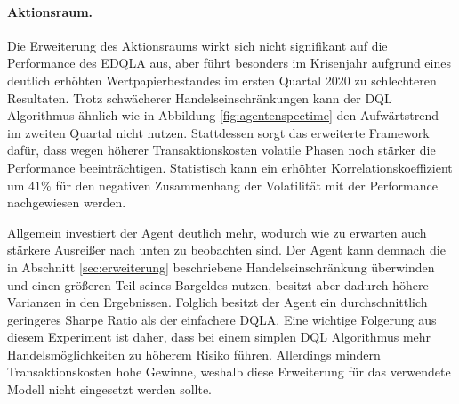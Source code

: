 \paragraph{Aktionsraum.}

Die Erweiterung des Aktionsraums wirkt sich nicht signifikant auf die Performance des \acs{EDQLA} aus, aber führt besonders im Krisenjahr aufgrund eines deutlich erhöhten Wertpapierbestandes im ersten Quartal 2020 zu schlechteren Resultaten. 
Trotz schwächerer Handelseinschränkungen kann der \acs{DQL} Algorithmus ähnlich wie in Abbildung \ref{fig:agentenspectime} den Aufwärtstrend im zweiten Quartal nicht nutzen.
Stattdessen sorgt das erweiterte Framework dafür, dass wegen höherer Transaktionskosten volatile Phasen noch stärker die Performance beeinträchtigen.
Statistisch kann ein erhöhter Korrelationskoeffizient um $41\%$ für den negativen Zusammenhang der Volatilität mit der Performance nachgewiesen werden.

Allgemein investiert der Agent deutlich mehr, wodurch wie zu erwarten auch stärkere Ausreißer nach unten zu beobachten sind.
Der Agent kann demnach die in Abschnitt \ref{sec:erweiterung} beschriebene Handelseinschränkung überwinden und einen größeren Teil seines Bargeldes nutzen, besitzt aber dadurch höhere Varianzen in den Ergebnissen. 
Folglich besitzt der Agent ein durchschnittlich geringeres Sharpe Ratio als der einfachere \acs{DQLA}.
Eine wichtige Folgerung aus diesem Experiment ist daher, dass bei einem simplen \acs{DQL} Algorithmus mehr Handelsmöglichkeiten zu höherem Risiko führen.
Allerdings mindern Transaktionskosten hohe Gewinne, weshalb diese Erweiterung für das verwendete Modell nicht eingesetzt werden sollte.




